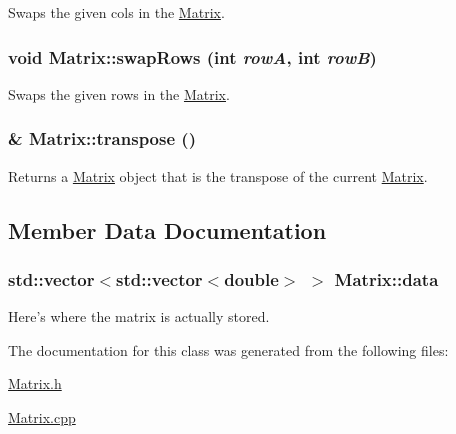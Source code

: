 Swaps the given cols in the \hyperlink{class_matrix}{Matrix}. 

\hypertarget{class_matrix_ac0e73d5e98817e12b82a3f626c8343de}{
\subsubsection[{swapRows}]{\setlength{\rightskip}{0pt plus 5cm}void Matrix::swapRows (int {\em rowA}, \/  int {\em rowB})}}
\label{class_matrix_ac0e73d5e98817e12b82a3f626c8343de}


Swaps the given rows in the \hyperlink{class_matrix}{Matrix}. 

\hypertarget{class_matrix_ad609fedfd61e93679803bb114e544569}{
\subsubsection[{transpose}]{ \& Matrix::transpose ()}}
\label{class_matrix_ad609fedfd61e93679803bb114e544569}


Returns a \hyperlink{class_matrix}{Matrix} object that is the transpose of the current \hyperlink{class_matrix}{Matrix}. 



\subsection{Member Data Documentation}
\hypertarget{class_matrix_adab4557133e13b08ae470a8e5df7b99c}{
\subsubsection[{data}]{\setlength{\rightskip}{0pt plus 5cm}std::vector$<$std::vector$<$double$>$ $>$ {\bf Matrix::data}}}
\label{class_matrix_adab4557133e13b08ae470a8e5df7b99c}


Here's where the matrix is actually stored. 



The documentation for this class was generated from the following files:\begin{DoxyCompactItemize}
\item 
\hyperlink{_matrix_8h}{Matrix.h}\item 
\hyperlink{_matrix_8cpp}{Matrix.cpp}\end{DoxyCompactItemize}
